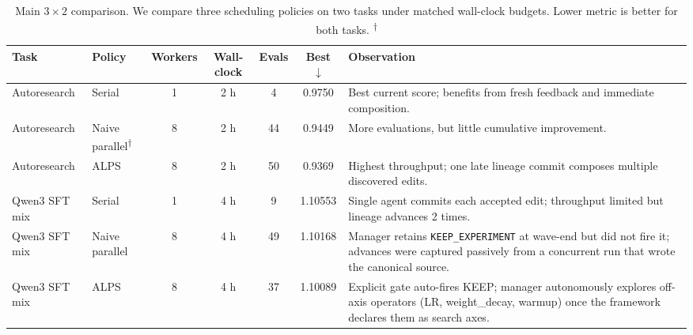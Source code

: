 \documentclass{article}
\newcommand{\alps}{ALPS\xspace}
\newcommand{\keep}{\texttt{KEEP\_EXPERIMENT}\xspace}
\newcommand{\lowerbetter}{$\downarrow$}
\begin{document}
\begin{table}[t]
\centering
\small
\begin{tabular}{llccccp{4.8cm}}
\toprule
Task & Policy & Workers & Wall-clock & Evals & Best \lowerbetter & Observation \\
\midrule
Autoresearch
& Serial
& 1
& 2 h
& 4
& 0.9750
& Best current score; benefits from fresh feedback and immediate composition. \\

Autoresearch
& Naive parallel\textsuperscript{$\dagger$}
& 8
& 2 h
& 44
& 0.9449
& More evaluations, but little cumulative improvement. \\

Autoresearch
& \alps
& 8
& 2 h
& 50
& 0.9369
& Highest throughput; one late lineage commit composes multiple discovered edits. \\

\midrule
Qwen3 SFT mix
& Serial
& 1
& 4 h
& 9
& 1.10553
& Single agent commits each accepted edit; throughput limited but lineage advances 2 times. \\

Qwen3 SFT mix
& Naive parallel
& 8
& 4 h
& 49
& 1.10168
& Manager retains \keep at wave-end but did not fire it; advances were captured passively from a concurrent run that wrote the canonical source. \\

Qwen3 SFT mix
& \alps
& 8
& 4 h
& 37
& 1.10089
& Explicit gate auto-fires KEEP; manager autonomously explores off-axis operators (LR, weight\_decay, warmup) once the framework declares them as search axes. \\

\bottomrule
\end{tabular}
\caption{
Main $3 \times 2$ comparison. We compare three scheduling policies on two tasks under matched wall-clock budgets. Lower metric is better for both tasks. \textsuperscript{$\dagger$}
}
\label{tab:main_results}
\end{table}
\end{document}
